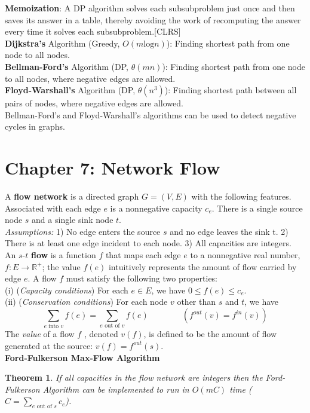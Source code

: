 \documentclass{report}
\newtheorem{Theorem}{Theorem}
\begin{document}
\textbf{Memoization}: A DP algorithm solves each subsubproblem just once and then saves its answer in a table, thereby avoiding the work of recomputing the answer every time it solves each subsubproblem.[CLRS]\\

\textbf{Dijkstra's} Algorithm (Greedy, $O(m\text{log}n)$): Finding shortest path from one node to all nodes.\\
\textbf{Bellman-Ford's} Algorithm (DP, $\theta(mn)$): Finding shortest path from one node to all nodes, where negative edges are allowed.\\
\textbf{Floyd-Warshall's} Algorithm (DP, $\theta(n^3)$): Finding shortest path between all pairs of nodes, where negative edges are allowed.\\

Bellman-Ford's and Floyd-Warshall's algorithms can be used to detect negative cycles in graphs.

\section*{Chapter 7: Network Flow}
A \textbf{flow network} is a directed graph $G = (V, E)$ with the following features. Associated with each edge $e$ is a nonnegative capacity $c_e$. There is a single source node $s$ and a single sink node $t$.\\

\textit{Assumptions:} 1) No edge enters the source $s$ and no edge leaves the sink t. 2) There is at least one edge incident to each node. 3) All capacities are integers.\\

An $s\text{-}t$ \textbf{flow} is a function $f$ that maps each edge $e$ to a
nonnegative real number, $f:E\rightarrow \mathbb{R}^+$; the value $f(e)$ intuitively represents the
amount of flow carried by edge $e$. A flow $f$ must satisfy the following two properties:\\
(i) (\emph{Capacity conditions}) For each $e \in E$, we have $0 \leq f(e) \leq c_e$.\\
(ii) (\emph{Conservation conditions}) For each node $v$ other than $s$ and $t$, we have
\[\sum_{e \text{ into } v} f(e) = \sum_{e \text{ out of } v} f(e) \qquad \qquad (f^{out}(v)=f^{in}(v))\]
The \emph{value} of a flow $f$ , denoted $v(f)$, is defined to be the amount of flow generated at the source: $v(f) = f^{out}(s)$.\\

\textbf{Ford-Fulkerson Max-Flow Algorithm}
\begin{Theorem}
If all capacities in the flow network are integers then the Ford-Fulkerson Algorithm can be implemented to run in $O(mC)$ time ($C=\sum_{e \text{ out of } s}c_e$).
\end{Theorem}
\end{document}
